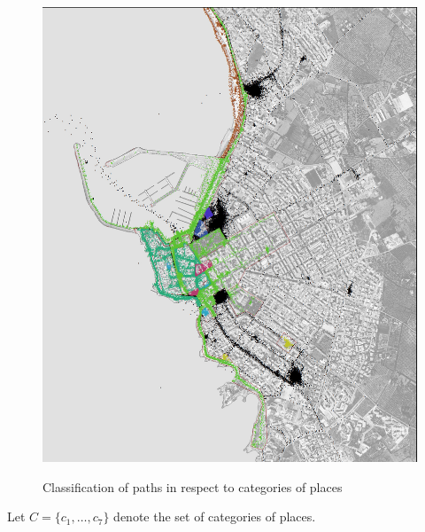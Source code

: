 \documentclass[a4paper]{article}
\begin{document}
\begin{figure}
  \centering
    \includegraphics[width=\textwidth]{10places}\\
  \caption{Classification of paths in respect to categories of places}\label{10places}
\end{figure}


Let $C=\{c_1, \ldots, c_7\}$ denote the set of categories of places.
\end{document}
